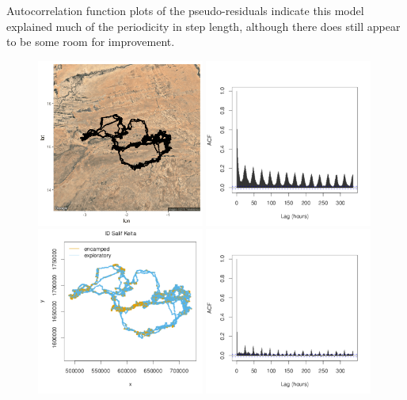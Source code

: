 \documentclass[12pt]{article}\usepackage[]{graphicx}\usepackage[]{color}
\begin{document}
Autocorrelation function plots of the pseudo-residuals indicate this model explained much of the periodicity in step length, although there does still appear to be some room for improvement.

\begin{figure}[htbp]
  \includegraphics[width=0.49\textwidth]{elephant_plotSat.png}
  \includegraphics[width=0.49\textwidth]{plot_elephantResults017.pdf}
  \includegraphics[width=0.49\textwidth]{plot_elephantResults015.pdf}
  \includegraphics[width=0.49\textwidth]{plot_elephantResults016.pdf}

\end{figure}
\end{document}
